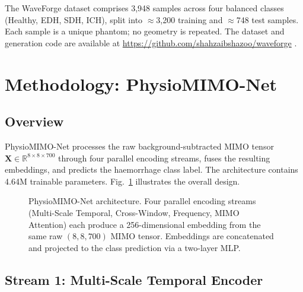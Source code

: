 \documentclass[journal]{IEEEtran}
\begin{document}
The WaveForge dataset comprises 3{,}948 samples across four
balanced classes (Healthy, EDH, SDH, ICH), split into
$\approx$3{,}200 training and $\approx$748 test samples.
Each sample is a unique phantom; no geometry is repeated.
The dataset and generation code are available at
\url{https://github.com/shahzaibshazoo/waveforge}
\cite{WaveForge2026}.


\section{Methodology: PhysioMIMO-Net}
\label{sec:method}

\subsection{Overview}

PhysioMIMO-Net processes the raw background-subtracted MIMO
tensor $\mathbf{X} \in \mathbb{R}^{8 \times 8 \times 700}$
through four parallel encoding streams, fuses the resulting
embeddings, and predicts the haemorrhage class label.  The
architecture contains 4.64M trainable parameters.
Fig.~\ref{fig:arch} illustrates the overall design.

\begin{figure}[!t]
\centering
\caption{PhysioMIMO-Net architecture.  Four parallel encoding
  streams (Multi-Scale Temporal, Cross-Window, Frequency,
  MIMO Attention) each produce a 256-dimensional embedding
  from the same raw $(8,8,700)$ MIMO tensor.  Embeddings are
  concatenated and projected to the class prediction via a
  two-layer MLP.}
\label{fig:arch}
\end{figure}

\subsection{Stream 1: Multi-Scale Temporal Encoder}
\end{document}
